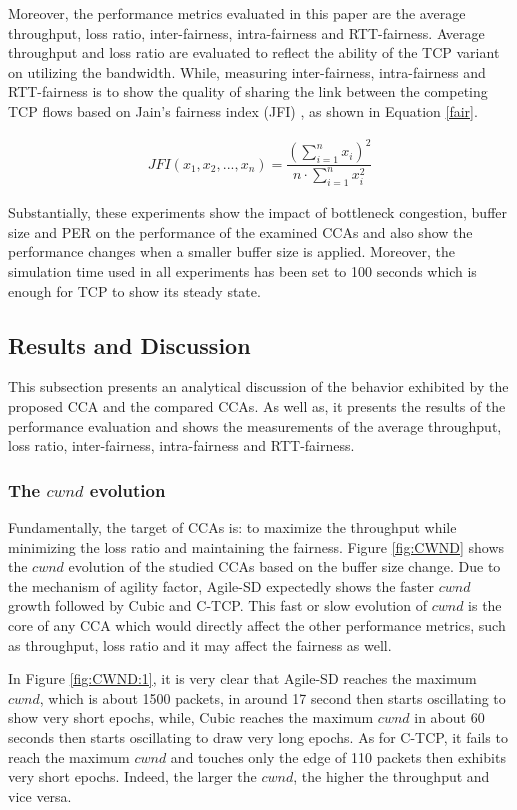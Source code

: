 \documentclass[preprint,3p,times,twocolumn,authoryear]{elsarticle}
\begin{document}
Moreover, the performance metrics evaluated in this paper are the average throughput, loss ratio, inter-fairness, intra-fairness and RTT-fairness. Average throughput and loss ratio are evaluated to reflect the ability of the TCP variant on utilizing the bandwidth. While, measuring inter-fairness, intra-fairness and RTT-fairness is to show the quality of sharing the link between the competing TCP flows based on Jain's fairness index (JFI) \citep{jain1984}, as shown in Equation \eqref{fair}.

\begin{align}
JFI(x_1, x_2, ..., x_n) = \dfrac{(\sum_{i=1}^{n} x_i)^2}{n \cdot \sum_{i=1}^{n} x_i^2} 								\label{fair}
\end{align}

Substantially, these experiments show the impact of bottleneck congestion, buffer size and PER on the performance of the examined CCAs and also show the performance changes when a smaller buffer size is applied. Moreover, the simulation time used in all experiments has been set to 100 seconds which is enough for TCP to show its steady state.

\subsection{Results and Discussion}

This subsection presents an analytical discussion of the behavior exhibited by the proposed CCA and the compared CCAs. As well as, it presents the results of the performance evaluation and shows the measurements of the average throughput, loss ratio, inter-fairness, intra-fairness and RTT-fairness.

\subsubsection{The $cwnd$ evolution}
Fundamentally, the target of CCAs is: to maximize the throughput while minimizing the loss ratio and maintaining the fairness. Figure \ref{fig:CWND} shows the $cwnd$ evolution of the studied CCAs based on the buffer size change. Due to the mechanism of agility factor, Agile-SD expectedly shows the faster $cwnd$ growth followed by Cubic and C-TCP. This fast or slow evolution of $cwnd$ is the core of any CCA which would directly affect the other performance metrics, such as throughput, loss ratio and it may affect the fairness as well.

In Figure \ref{fig:CWND:1}, it is very clear that Agile-SD reaches the maximum $cwnd$, which is about 1500 packets, in around 17 second then starts oscillating to show very short epochs, while, Cubic reaches the maximum $cwnd$ in about 60 seconds then starts oscillating to draw very long epochs. As for C-TCP, it fails to reach the maximum $cwnd$ and touches only the edge of 110 packets then exhibits very short epochs. Indeed, the larger the $cwnd$, the higher the throughput and vice versa.
\end{document}
